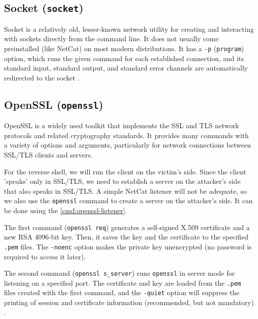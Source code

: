 \subsection{Socket (\texttt{socket})}


Socket is a relatively old, lesser-known network utility for creating and interacting with sockets directly from the command line. It does not usually come preinstalled (like NetCat) on most modern distributions. It has a \texttt{-p} (\texttt{program}) option, which runs the given command for each established connection, and its standard input, standard output, and standard error channels are automatically redirected to the socket \cite{socket-man}.



\subsection{OpenSSL (\texttt{openssl})}


OpenSSL is a widely used toolkit that implements the SSL and TLS network protocols and related cryptography standards. It provides many commands with a variety of options and arguments, particularly for network connections between SSL/TLS clients and servers.

For the reverse shell, we will run the client on the victim's side. Since the client 'speaks' only in SSL/TLS, we need to establish a server on the attacker's side that also speaks in SSL/TLS. A simple NetCat listener will not be adequate, so we also use the \texttt{openssl} command to create a server on the attacker's side. It can be done using the \cref{cmd:openssl-listener}.


The first command (\texttt{openssl req}) generates a self-signed X.509 certificate and a new RSA 4096-bit key. Then, it saves the key and the certificate to the specified \texttt{.pem} files. The \texttt{-noenc} option makes the private key unencrypted (no password is required to access it later).

The second command (\texttt{openssl s\_server}) runs \texttt{openssl} in server mode for listening on a specified port. The certificate and key are loaded from the \texttt{.pem} files created with the first command, and the \texttt{-quiet} option will suppress the printing of session and certificate information (recommended, but not mandatory) \cite{openssl-doc}.

